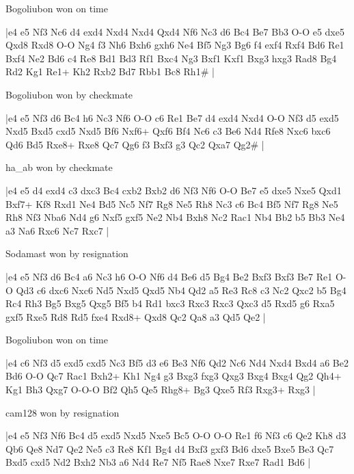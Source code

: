 \showboard

Bogoliubon won on time

\makegametitle
|e4 e5 Nf3 Nc6 d4 exd4 Nxd4 Nxd4 Qxd4 Nf6 Nc3 d6 Bc4 Be7 Bb3 O-O e5 dxe5 Qxd8 Rxd8 O-O Ng4 f3 Nh6 Bxh6 gxh6 Ne4 Bf5 Ng3 Bg6 f4 exf4 Rxf4 Bd6 Re1 Bxf4 Ne2 Bd6 c4 Re8 Bd1 Bd3 Rf1 Bxc4 Ng3 Bxf1 Kxf1 Bxg3 hxg3 Rad8 Bg4 Rd2 Kg1 Re1+ Kh2 Rxb2 Bd7 Rbb1 Bc8 Rh1\#  |

\showboard

Bogoliubon won by checkmate

\makegametitle
|e4 e5 Nf3 d6 Bc4 h6 Nc3 Nf6 O-O c6 Re1 Be7 d4 exd4 Nxd4 O-O Nf3 d5 exd5 Nxd5 Bxd5 cxd5 Nxd5 Bf6 Nxf6+ Qxf6 Bf4 Nc6 c3 Be6 Nd4 Rfe8 Nxc6 bxc6 Qd6 Bd5 Rxe8+ Rxe8 Qc7 Qg6 f3 Bxf3 g3 Qc2 Qxa7 Qg2\#  |

\showboard

ha\_ab won by checkmate

\makegametitle
|e4 e5 d4 exd4 c3 dxc3 Bc4 cxb2 Bxb2 d6 Nf3 Nf6 O-O Be7 e5 dxe5 Nxe5 Qxd1 Bxf7+ Kf8 Rxd1 Ne4 Bd5 Nc5 Nf7 Rg8 Ne5 Rh8 Nc3 c6 Bc4 Bf5 Nf7 Rg8 Ne5 Rh8 Nf3 Nba6 Nd4 g6 Nxf5 gxf5 Ne2 Nb4 Bxh8 Nc2 Rac1 Nb4 Bb2 b5 Bb3 Ne4 a3 Na6 Rxc6 Nc7 Rxc7  |

\showboard

Sodamast won by resignation

\makegametitle
|e4 e5 Nf3 d6 Bc4 a6 Nc3 h6 O-O Nf6 d4 Be6 d5 Bg4 Be2 Bxf3 Bxf3 Be7 Re1 O-O Qd3 c6 dxc6 Nxc6 Nd5 Nxd5 Qxd5 Nb4 Qd2 a5 Re3 Rc8 c3 Nc2 Qxc2 b5 Bg4 Rc4 Rh3 Bg5 Bxg5 Qxg5 Bf5 b4 Rd1 bxc3 Rxc3 Rxc3 Qxc3 d5 Rxd5 g6 Rxa5 gxf5 Rxe5 Rd8 Rd5 fxe4 Rxd8+ Qxd8 Qc2 Qa8 a3 Qd5 Qe2  |

\showboard

Bogoliubon won on time

\makegametitle
|e4 c6 Nf3 d5 exd5 cxd5 Nc3 Bf5 d3 e6 Be3 Nf6 Qd2 Nc6 Nd4 Nxd4 Bxd4 a6 Be2 Bd6 O-O Qc7 Rac1 Bxh2+ Kh1 Ng4 g3 Bxg3 fxg3 Qxg3 Bxg4 Bxg4 Qg2 Qh4+ Kg1 Bh3 Qxg7 O-O-O Bf2 Qh5 Qe5 Rhg8+ Bg3 Qxe5 Rf3 Rxg3+ Rxg3  |

\showboard

cam128 won by resignation

\makegametitle
|e4 e5 Nf3 Nf6 Bc4 d5 exd5 Nxd5 Nxe5 Bc5 O-O O-O Re1 f6 Nf3 c6 Qe2 Kh8 d3 Qb6 Qe8 Nd7 Qe2 Ne5 c3 Re8 Kf1 Bg4 d4 Bxf3 gxf3 Bd6 dxe5 Bxe5 Be3 Qc7 Bxd5 cxd5 Nd2 Bxh2 Nb3 a6 Nd4 Re7 Nf5 Rae8 Nxe7 Rxe7 Rad1 Bd6  |

